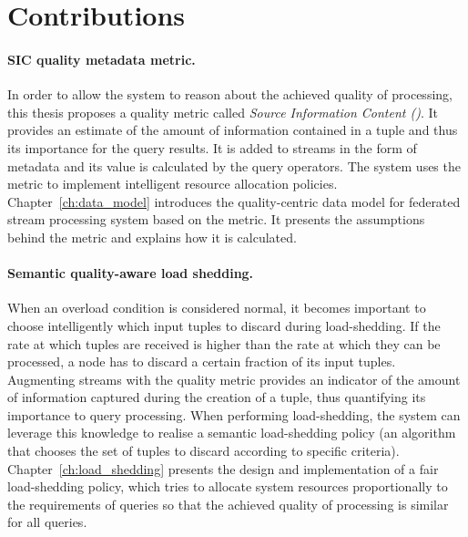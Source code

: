 \section{Contributions}
\vspace{-3pt}
\paragraph{SIC quality metadata metric.}
In order to allow the system to reason about the achieved quality of processing, this thesis
proposes a quality metric called \emph{Source Information Content (\sic)}. 
It provides an estimate of the amount of information contained in a tuple and
thus its importance for the query results. 
It is added to streams in the form of metadata and its value is calculated by the query operators.
The system uses the \sic metric to implement intelligent resource allocation policies.
Chapter~\ref{ch:data_model} introduces the quality-centric data model for federated stream processing
system based on the \sic metric. It presents the assumptions behind the \sic metric and explains
how it is calculated.
\vspace{-3pt}
\paragraph{Semantic quality-aware load shedding.}
When an overload condition is considered normal, it becomes important to choose intelligently which input
tuples to discard during \mbox{load-shedding}. 
If the rate at which tuples are received is higher than the rate at which they can be
processed, a node has to discard a certain fraction of its input
tuples. 
Augmenting streams with the \sic quality metric provides an indicator of the amount of
information captured during the creation of a tuple, thus quantifying its importance to query processing.
When performing \mbox{load-shedding}, the system can leverage this knowledge to realise a semantic
load-shedding policy (\ie an algorithm that chooses the set of tuples to discard according to
specific criteria). 
Chapter~\ref{ch:load_shedding} presents the design and implementation of a fair load-shedding policy,
which tries to allocate system resources proportionally to the requirements of queries so that the
achieved quality of processing is similar for all queries.
\vspace{-3pt}
